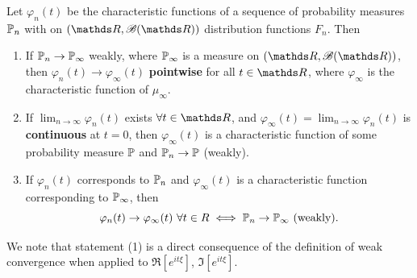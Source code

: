\begin{theorem} \label{thm:levi_continuity}
Let $\varphi_n(t)$ be the characteristic functions of a sequence of probability measures $\mathbb{P}_n$ with on $(\R,\B(\R))$ distribution functions $F_n$. Then
\begin{enumerate}
    \item If $\mathbb{P}_n \to \mathbb{P}_\infty$ weakly, where $\mathbb{P}_\infty$ is a measure on $(\R,\B(\R))$, then $\varphi_n(t) \to \varphi_\infty(t)$ \textbf{pointwise} for all $t \in \R$, where $\varphi_\infty$ is the characteristic function of $\mu_\infty$.
    \item If $\lim_{n \to \infty} \varphi_n(t)$ exists $\forall t \in \R$, and $\varphi_\infty(t) = \lim_{n \to \infty} \varphi_n(t)$ is \textbf{continuous} at $t=0$, then $\varphi_\infty(t)$ is a characteristic function of some probability measure $\mathbb{P}$ and $\mathbb{P}_n \to \mathbb{P}$ (weakly). 
    \item If $\varphi_n(t)$ corresponds to $\mathbb{P}_n$ and $\varphi_\infty(t)$ is a characteristic function corresponding to $\mathbb{P}_\infty$, then
    \begin{equation*}
        \varphi_n(t) \to \varphi_\infty(t)\, \, \forall t \in R \iff \mathbb{P}_n \to \mathbb{P}_\infty \text{ (weakly)}.
    \end{equation*}
\end{enumerate}
\end{theorem}

We note that statement (1) is a direct consequence of the definition of weak convergence when applied to $\Re[e^{it\xi}]$, $\Im[e^{it\xi}]$.

